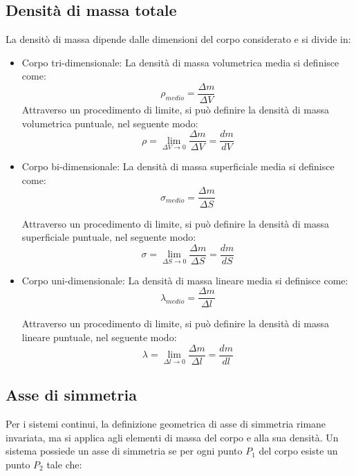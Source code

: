 \documentclass[11pt, a4paper, openright]{book}
\theoremstyle{plain}
\theoremstyle{definition}
\begin{document}
\subsection{Densità di massa totale}
La densitò di massa dipende dalle dimensioni del corpo considerato e si divide in:
\begin{itemize}
    \item Corpo tri-dimensionale:
        La densità di massa volumetrica media si definisce come:
            \begin{equation}
                \rho_{medio} = \frac{\Delta m}{\Delta V}
            \end{equation}
        Attraverso un procedimento di limite, si può definire la densità di massa volumetrica puntuale, nel seguente modo:
            \begin{equation}
                \rho = \lim_{\Delta V \to 0} \frac{\Delta m}{\Delta V} = \frac{dm}{dV}
            \end{equation}
    \item Corpo bi-dimensionale:
        La densità di massa superficiale media si definisce come:
        \[\sigma_{medio} = \frac{\Delta m}{\Delta S}\]

        Attraverso un procedimento di limite, si può definire la densità di massa superficiale puntuale, nel seguente modo:
        \begin{equation}
            \sigma = \lim_{\Delta S \to 0} \frac{\Delta m}{\Delta S} = \frac{dm}{dS}
        \end{equation}
    \item Corpo uni-dimensionale:
        La densità di massa lineare media si definisce come:
        \[\lambda_{medio} = \frac{\Delta m}{\Delta l}\]

        Attraverso un procedimento di limite, si può definire la densità di massa lineare puntuale, nel seguente modo:
        \begin{equation}
            \lambda = \lim_{\Delta l \to 0} \frac{\Delta m}{\Delta l} = \frac{dm}{dl}
        \end{equation}
\end{itemize}

\subsection{Asse di simmetria}
Per i sistemi continui, la definizione geometrica di asse di simmetria rimane invariata, ma si applica agli elementi di massa del corpo e alla sua densità. Un sistema possiede un asse di simmetria se per ogni punto $P_1$ del corpo esiste un punto $P_2$ tale che:
\end{document}
